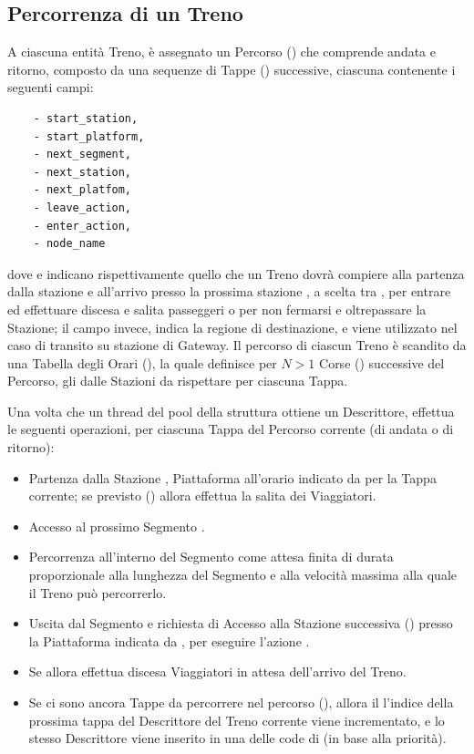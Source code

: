 	\subsection{Percorrenza di un Treno}
	
	A ciascuna entità Treno, è assegnato un Percorso () che comprende andata e ritorno, composto da una sequenze di Tappe () successive, ciascuna contenente i seguenti campi:
				\begin{center}
\begin{verbatim}
    - start_station,
    - start_platform,
    - next_segment,
    - next_station,
    - next_platfom,
    - leave_action,
    - enter_action,
    - node_name
\end{verbatim}
				\end{center}
dove  e  indicano rispettivamente quello che un Treno dovrà compiere alla partenza dalla stazione  e all'arrivo presso la prossima stazione , a scelta tra , per entrare ed effettuare discesa e salita passeggeri o  per non fermarsi e oltrepassare la Stazione; il campo  invece, indica la regione di destinazione, e viene utilizzato nel caso di transito su stazione di Gateway.
	Il percorso di ciascun Treno è scandito da una Tabella degli Orari (), la quale definisce per $N>1$ Corse () successive del Percorso, gli  dalle Stazioni da rispettare per ciascuna Tappa. 
	 
Una volta che un thread del pool della struttura  ottiene un Descrittore, effettua le seguenti  operazioni, per ciascuna Tappa del Percorso corrente (di andata o di ritorno):
				\begin{itemize} 
					\item Partenza dalla Stazione , Piattaforma  all'orario indicato da  per la Tappa corrente; se previsto () allora effettua la salita dei Viaggiatori.
					\item Accesso al prossimo Segmento .
					\item Percorrenza all'interno del Segmento come attesa finita di durata proporzionale alla lunghezza del Segmento e alla velocità massima alla quale il Treno può percorrerlo.
					\item Uscita dal Segmento e richiesta di Accesso alla Stazione successiva () presso la Piattaforma indicata da , per eseguire l'azione .
					\item Se  allora effettua discesa Viaggiatori in attesa dell'arrivo del Treno.
					\item Se ci sono ancora Tappe da percorrere nel percorso (), allora il l'indice della prossima tappa del Descrittore del Treno corrente viene incrementato, e lo stesso Descrittore viene inserito in una delle code di  (in base alla priorità). 
				\end{itemize}


